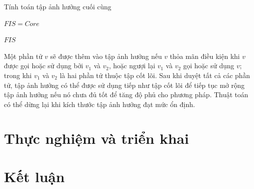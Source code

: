 \documentclass[12pt,a4paper]{report}
\newenvironment{thuattoan}[1][h]
  {\renewcommand{\algorithmcfname}{Thuật toán}
   \begin{algorithm}[#1]
  }{\end{algorithm}}
\begin{document}
\begin{thuattoan}
\label{algo:cal-fis}
\caption{Tính toán tập ảnh hưởng cuối cùng}


 $FIS = Core$\;
  {
 }

 \Return $FIS$\;
\end{thuattoan}

Một phần tử $v$ sẽ được thêm vào tập ảnh hưởng nếu $v$ thỏa mãn điều kiện khi $v$ được gọi hoặc sử dụng bởi $v_1$ và $v_2$, hoặc ngượi lại $v_1$ và $v_2$ gọi hoặc sử dụng $v$; trong khi $v_1$ và $v_2$ là hai phần tử thuộc tập cốt lõi. Sau khi duyệt tất cả các phần tử, tập ảnh hưởng có thể được sử dụng tiếp như tập cốt lõi để tiếp tục mở rộng tập ảnh hưởng nếu nó chưa đủ tốt để tăng độ phủ cho phương pháp. Thuật toán có thể dừng lại khi kích thước tập ảnh hưởng đạt mức ổn định.\\
\chapter{Thực nghiệm và triển khai}
\chapter{Kết luận}
\end{document}
